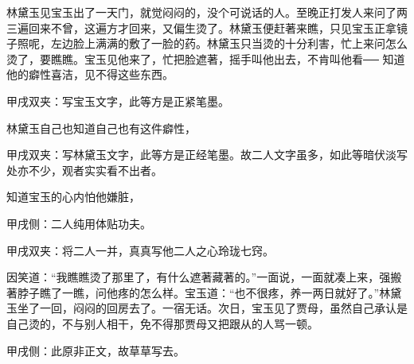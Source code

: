 \begin{parag}
    林黛玉见宝玉出了一天门，就觉闷闷的，没个可说话的人。至晚正打发人来问了两三遍回来不曾，这遍方才回来，又偏生烫了。林黛玉便赶著来瞧，只见宝玉正拿镜子照呢，左边脸上满满的敷了一脸的药。林黛玉只当烫的十分利害，忙上来问怎么烫了，要瞧瞧。宝玉见他来了，忙把脸遮著，摇手叫他出去，不肯叫他看── 知道他的癖性喜洁，见不得这些东西。\begin{note}甲戌双夹：写宝玉文字，此等方是正紧笔墨。\end{note}林黛玉自己也知道自己也有这件癖性，\begin{note}甲戌双夹：写林黛玉文字，此等方是正经笔墨。故二人文字虽多，如此等暗伏淡写处亦不少，观者实实看不出者。\end{note}知道宝玉的心内怕他嫌脏，\begin{note}甲戌侧：二人纯用体贴功夫。\end{note}\begin{note}甲戌双夹：将二人一并，真真写他二人之心玲珑七窍。\end{note}因笑道：“我瞧瞧烫了那里了，有什么遮著藏著的。”一面说，一面就凑上来，强搬著脖子瞧了一瞧，问他疼的怎么样。宝玉道：“也不很疼，养一两日就好了。”林黛玉坐了一回，闷闷的回房去了。一宿无话。次日，宝玉见了贾母，虽然自己承认是自己烫的，不与别人相干，免不得那贾母又把跟从的人骂一顿。\begin{note}甲戌侧：此原非正文，故草草写去。\end{note}
\end{parag}


